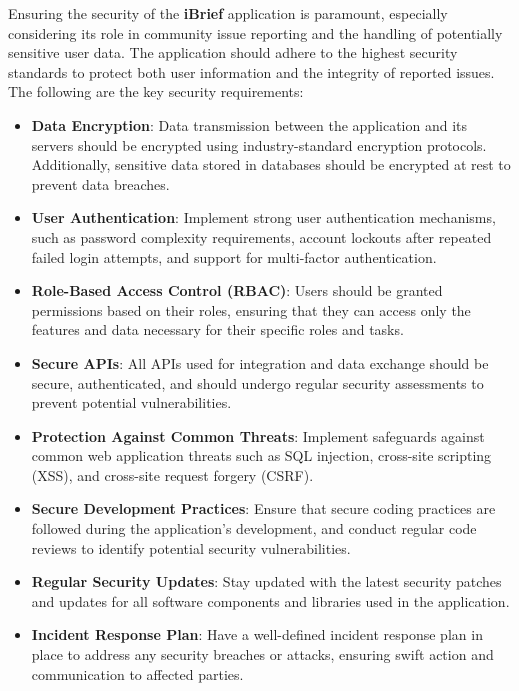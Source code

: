 Ensuring the security of the \textbf{iBrief} application is paramount, especially considering its role in community issue reporting and the handling of potentially sensitive user data. The application should adhere to the highest security standards to protect both user information and the integrity of reported issues. The following are the key security requirements:

\begin{itemize}
    \item \textbf{Data Encryption}: Data transmission between the application and its servers should be encrypted using industry-standard encryption protocols. Additionally, sensitive data stored in databases should be encrypted at rest to prevent data breaches.

    \item \textbf{User Authentication}: Implement strong user authentication mechanisms, such as password complexity requirements, account lockouts after repeated failed login attempts, and support for multi-factor authentication.

    \item \textbf{Role-Based Access Control (RBAC)}: Users should be granted permissions based on their roles, ensuring that they can access only the features and data necessary for their specific roles and tasks.

    \item \textbf{Secure APIs}: All APIs used for integration and data exchange should be secure, authenticated, and should undergo regular security assessments to prevent potential vulnerabilities.

    \item \textbf{Protection Against Common Threats}: Implement safeguards against common web application threats such as SQL injection, cross-site scripting (XSS), and cross-site request forgery (CSRF).

    \item \textbf{Secure Development Practices}: Ensure that secure coding practices are followed during the application's development, and conduct regular code reviews to identify potential security vulnerabilities.

    \item \textbf{Regular Security Updates}: Stay updated with the latest security patches and updates for all software components and libraries used in the application.

    \item \textbf{Incident Response Plan}: Have a well-defined incident response plan in place to address any security breaches or attacks, ensuring swift action and communication to affected parties.


\end{itemize}
